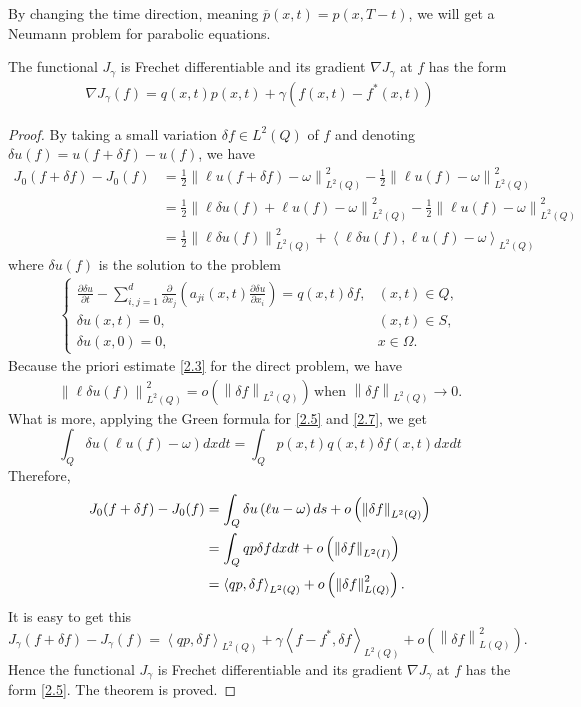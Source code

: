 \documentclass[]{article}
\begin{document}
By changing the time direction, meaning $\overline{p}(x, t)=p(x, T-t)$, we will get a Neumann problem for parabolic equations.
\begin{dl}
	The functional $J_\gamma$ is Frechet differentiable and its gradient $\nabla J_\gamma$ at $f$ has the form 
	\begin{align}\label{2.6}
		\nabla J_\gamma(f)=q(x, t)p(x, t)+\gamma \left(f(x, t)-f^*(x, t)\right)
	\end{align}
\end{dl}
\begin{proof}
	By taking a small variation $\delta f \in L^2(Q)$ of $f$ and denoting $\delta u(f)=u(f+\delta f)-u(f)$, we have
	\begin{align*}
		J_0(f+\delta f)-J_0(f)&=\frac{1}{2}\left\|\ell u(f+\delta f)-\omega\right\|^2_{L^2(Q)}-\frac{1}{2}\left\|\ell u(f)-\omega\right\|^2_{L^2(Q)}\\
		&=\frac{1}{2}\left\|\ell \delta u(f) +\ell u(f)-\omega\right\|^2_{L^2(Q)}-\frac{1}{2}\left\|\ell u(f)-\omega\right\|^2_{L^2(Q)}\\
		&=\frac{1}{2}\left\|\ell \delta u(f)\right\|^2_{L^2(Q)}+\left\langle \ell \delta u(f), \ell u(f)-\omega\right\rangle_{L^2(Q)}
	\end{align*}
	where $\delta u(f)$ is the solution to the problem
	\begin{align}\label{2.7}
		\begin{cases}
			\frac{\partial \delta u}{\partial t}-\sum\limits_{i, j=1}^{d}\frac{\partial}{\partial x_j}\left(a_{ji}(x, t)\frac{\partial \delta u}{\partial x_i}\right)=q(x, t)\delta f,&(x, t)\in Q,\\
			\delta u(x, t)=0, & (x, t)\in S,\\
			\delta u(x, 0)=0, &x\in \Omega.
		\end{cases}
	\end{align}
	Because the priori estimate \eqref{2.3} for the direct problem, we have
	\begin{align*}
		\left\|\ell\delta u(f)\right\|_{L^2(Q)}^2=o\left(\left\|\delta f\right\|_{L^2(Q)}\right)\, \text{when } \left\|\delta f\right\|_{L^2(Q)}\to 0.
	\end{align*}
	What is more, applying the Green formula for \eqref{2.5} and \eqref{2.7}, we get
	$$\int_{Q} \delta u \left(\ell u(f)-\omega\right)dxdt=\int_{Q} p(x, t)q(x, t)\delta f(x, t)dxdt$$
	Therefore,
	\begin{align*}
		J_0(f+\delta f)-J_0(f)&=\int_{Q}\delta u\left(\ell u-\omega\right)ds+o\left(\left\|\delta f\right\|_{L^2(Q)}\right)\notag\\
		&=\int_Q qp\delta fdxdt+o\left(\left\|\delta f\right\|_{L^2(I)}\right)\notag\\
		&=\left\langle qp,\delta f \right\rangle_{L^2(Q)}+o\left(\left\|\delta f\right\|^2_{L(Q)}\right).
	\end{align*}
	It is easy to get this
	$$J_\gamma(f+\delta f)-J_\gamma(f)=\left\langle qp,\delta f \right\rangle_{L^2(Q)}+\gamma\left\langle f-f^*,\delta f \right\rangle_{L^2(Q)}+o\left(\left\|\delta f\right\|^2_{L(Q)}\right).$$
	Hence the functional $J_\gamma$ is Frechet differentiable and its gradient $\nabla J_\gamma$ at $f$ has the form \eqref{2.5}. The theorem is proved.
\end{proof}
\end{document}
